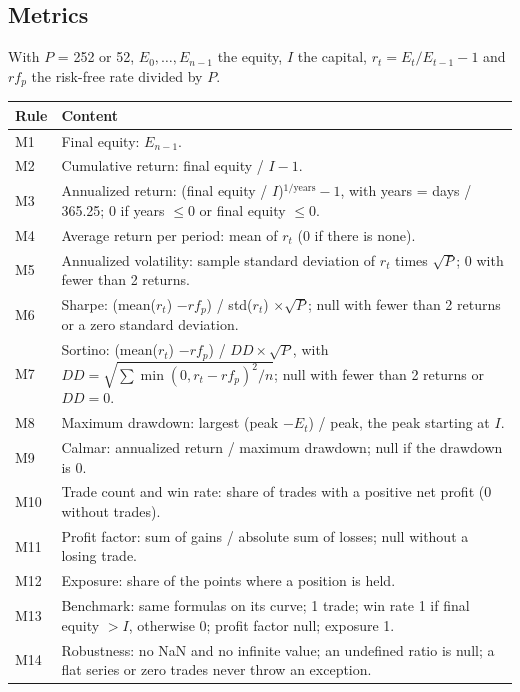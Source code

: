 \documentclass[11pt,a4paper]{article}
\begin{document}
\subsection*{Metrics}
With $P$ = 252 or 52, $E_0,\dots,E_{n-1}$ the equity, $I$ the capital, $r_t = E_t/E_{t-1}-1$ and $rf_p$ the risk-free rate divided by $P$.
\begin{longtable}{@{}p{0.9cm}p{14.8cm}@{}}
\toprule
\textbf{Rule} & \textbf{Content} \\
\midrule
\endhead
M1 & Final equity: $E_{n-1}$. \\
M2 & Cumulative return: final equity / $I - 1$. \\
M3 & Annualized return: (final equity / $I$)$^{1/\text{years}} - 1$, with years = days / 365.25; 0 if years $\leq 0$ or final equity $\leq 0$. \\
M4 & Average return per period: mean of $r_t$ (0 if there is none). \\
M5 & Annualized volatility: sample standard deviation of $r_t$ times $\sqrt{P}$; 0 with fewer than 2 returns. \\
M6 & Sharpe: (mean($r_t$) $- rf_p$) / std($r_t$) $\times \sqrt{P}$; null with fewer than 2 returns or a zero standard deviation. \\
M7 & Sortino: (mean($r_t$) $- rf_p$) / $DD \times \sqrt{P}$, with $DD = \sqrt{\sum\min(0, r_t - rf_p)^2 / n}$; null with fewer than 2 returns or $DD = 0$. \\
M8 & Maximum drawdown: largest (peak $- E_t$) / peak, the peak starting at $I$. \\
M9 & Calmar: annualized return / maximum drawdown; null if the drawdown is 0. \\
M10 & Trade count and win rate: share of trades with a positive net profit (0 without trades). \\
M11 & Profit factor: sum of gains / absolute sum of losses; null without a losing trade. \\
M12 & Exposure: share of the points where a position is held. \\
M13 & Benchmark: same formulas on its curve; 1 trade; win rate 1 if final equity $> I$, otherwise 0; profit factor null; exposure 1. \\
M14 & Robustness: no NaN and no infinite value; an undefined ratio is null; a flat series or zero trades never throw an exception. \\
\bottomrule
\end{longtable}
\end{document}
